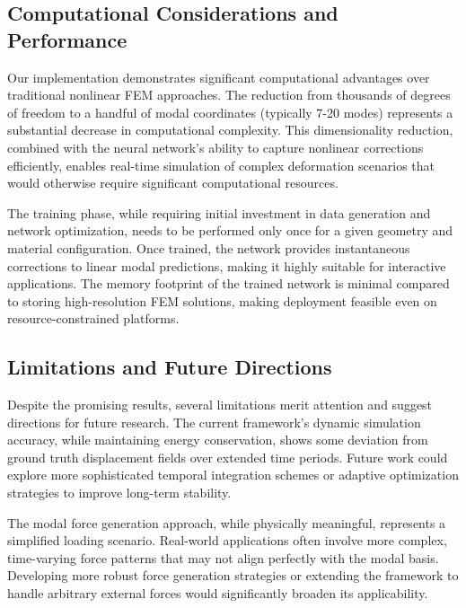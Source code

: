 \documentclass[11pt,a4paper]{article}
\numberwithin{equation}{section}
\begin{document}
\subsection{Computational Considerations and Performance}
Our implementation demonstrates significant computational advantages over traditional nonlinear FEM approaches. The reduction from thousands of degrees of freedom to a handful of modal coordinates (typically 7-20 modes) represents a substantial decrease in computational complexity. This dimensionality reduction, combined with the neural network's ability to capture nonlinear corrections efficiently, enables real-time simulation of complex deformation scenarios that would otherwise require significant computational resources.

The training phase, while requiring initial investment in data generation and network optimization, needs to be performed only once for a given geometry and material configuration. Once trained, the network provides instantaneous corrections to linear modal predictions, making it highly suitable for interactive applications. The memory footprint of the trained network is minimal compared to storing high-resolution FEM solutions, making deployment feasible even on resource-constrained platforms.

\subsection{Limitations and Future Directions}
Despite the promising results, several limitations merit attention and suggest directions for future research. The current framework's dynamic simulation accuracy, while maintaining energy conservation, shows some deviation from ground truth displacement fields over extended time periods. Future work could explore more sophisticated temporal integration schemes or adaptive optimization strategies to improve long-term stability.

The modal force generation approach, while physically meaningful, represents a simplified loading scenario. Real-world applications often involve more complex, time-varying force patterns that may not align perfectly with the modal basis. Developing more robust force generation strategies or extending the framework to handle arbitrary external forces would significantly broaden its applicability.
\end{document}
